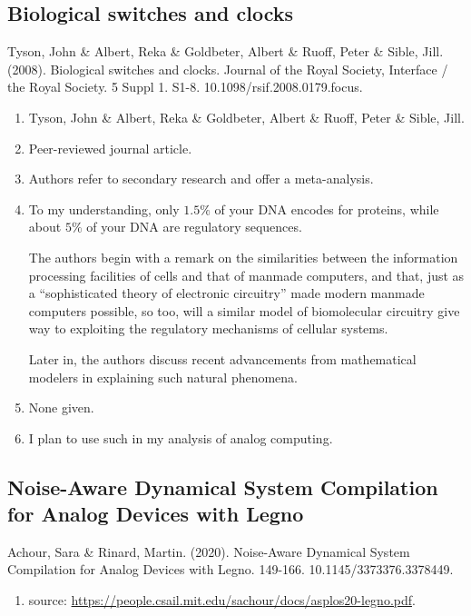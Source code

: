 \subsection*{Biological switches and clocks}
Tyson, John \& Albert, Reka \& Goldbeter, Albert \& Ruoff, Peter \& Sible, Jill. (2008). Biological switches and clocks. Journal of the Royal Society, Interface / the Royal Society. 5 Suppl 1. S1-8. 10.1098/rsif.2008.0179.focus. 
\begin{enumerate}
    \item Tyson, John \& Albert, Reka \& Goldbeter, Albert \& Ruoff, Peter \& Sible, Jill.
    \item Peer-reviewed journal article.
    \item Authors refer to secondary research and offer a meta-analysis.
    \item To my understanding, only $1.5\%$ of your DNA encodes for proteins, while about $5\%$ of your DNA are regulatory sequences.
    
    The authors begin with a remark on the similarities between the information processing facilities of cells and that of manmade computers, and that, just as a ``sophisticated theory of electronic circuitry'' made modern manmade computers possible, so too, will a similar model of biomolecular circuitry give way to exploiting the regulatory mechanisms of cellular systems. 

    Later in, the authors discuss recent advancements from mathematical modelers in explaining such natural phenomena.
    \item None given. 
    \item I plan to use such in my analysis of analog computing. 
\end{enumerate}

\subsection*{Noise-Aware Dynamical System Compilation for Analog Devices with Legno}

Achour, Sara \& Rinard, Martin. (2020). Noise-Aware Dynamical System Compilation for Analog Devices with Legno. 149-166. 10.1145/3373376.3378449. 

\begin{enumerate}
    \item source: \url{https://people.csail.mit.edu/sachour/docs/asplos20-legno.pdf}.
\end{enumerate}

